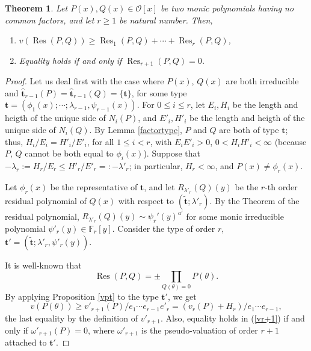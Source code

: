 \documentclass{amsart}
\newtheorem{theorem}{Theorem}[section]
\def\op{\operatorname}
\def\be{\bigskip}
\def\ff#1{\mathbb{F}_{#1}}
\def\la{\lambda}
\def\om{\omega}
\def\oo{{\mathcal O}}
\def\res{\op{Res}}
\def\t{\theta}
\def\tt{\hat{\mathbf{t}}}
\def\ty{\mathbf{t}}
\def\zpx{\oo[x]}
\begin{document}
\begin{theorem}\label{resultant}
Let $P(x),Q(x)\in\zpx$ be two monic polynomials having no common factors, and let $r\ge 1$ be natural number. Then, 
\begin{enumerate}
 \item $v(\res(P,Q))\ge \res_1(P,Q)+\cdots+\res_r(P,Q)$, 
\item Equality holds if and only if $\res_{r+1}(P,Q)=0$.
\end{enumerate}
\end{theorem}

\begin{proof}
Let us deal first with the case where $P(x)$, $Q(x)$ are both irreducible and $\tt_{r-1}(P)=\tt_{r-1}(Q)=\{\ty\}$, for some type $\ty=(\phi_1(x);\cdots;\la_{r-1},\psi_{r-1}(x))$. For $0\le i\le r$, let $E_i,H_i$ be the length and heigth of the unique side of $N_i(P)$, and $E'_i,H'_i$ be the length and heigth of the unique side of $N_i(Q)$. By Lemma \ref{factortype}, $P$ and $Q$ are both of type $\ty$; thus, $H_i/E_i=H'_i/E'_i$, for all $1\le i<r$, with $E_iE'_i>0$, $0<H_iH'_i<\infty$ (because $P$, $Q$ cannot be both equal to $\phi_i(x)$). Suppose that $-\la_r:=H_r/E_r\le H'_r/E'_r=:-\la'_r$; in particular, $H_r<\infty$, and $P(x)\ne\phi_r(x)$.

Let $\phi_r(x)$ be the representative of $\ty$, and let $R_{\la'_r}(Q)(y)$ be the $r$-th order residual polynomial of $Q(x)$ with respect to $(\tilde{\ty};\la'_r)$. By the Theorem of the residual polynomial, $R_{\la'_r}(Q)(y)\sim \psi_r'(y)^{a'}$ for some monic irreducible polynomial $\psi'_r(y)\in\ff{r}[y]$. Consider the type of order $r$, $\ty'=(\tilde{\ty};\la'_r,\psi'_r(y))$. 

It is well-known that
$$
\res(P,Q)=\pm \prod_{Q(\t)=0}P(\t).
$$By applying Proposition \ref{vpt} to the type $\ty'$, we get 
\begin{equation}\label{vr+1}
v(P(\t))\ge v'_{r+1}(P)/e_1\cdots e_{r-1}e'_r=(v_r(P)+H_r)/e_1\cdots e_{r-1},
\end{equation}
the last equality by the definition of $v'_{r+1}$. Also, equality holds in (\ref{vr+1}) if and only if $\om'_{r+1}(P)=0$, where $\om'_{r+1}$ is the pseudo-valuation of order $r+1$ attached to $\ty'$.\be


\end{proof}
\end{document}
